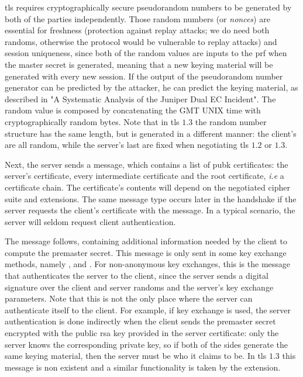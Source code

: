 \documentclass{llncs}
\begin{document}
\gls{tls} requires cryptographically secure pseudorandom numbers to be generated
by both of the parties independently. Those random numbers (or \textit{nonces}) are essential for freshness
(protection against replay attacks; we do need both randoms, otherwise the
protocol would be vulnerable to replay attacks) and session uniqueness, since both of
the random values are inputs to the \gls{prf} when the master secret is generated, meaning
that a new keying material will be generated with every new session. If the output of the pseudorandom number generator
can be predicted by the attacker, he can predict the keying material, as described
in "A Systematic Analysis of the Juniper Dual EC Incident"\cite{DualECJu15:online}.
The  random value is composed by concatenating the 
GMT UNIX time with  cryptographically random bytes. Note that in \gls{tls} $1.3$
the random number structure has the same length, but is generated in a different manner:
the client's  are all random, while the server's last 
are fixed when negotiating \gls{tls} $1.2$ or $1.3$.

Next, the server sends a  message, which contains a list
of \gls{pubk} certificates: the server's certificate,
every intermediate certificate and the root certificate, \textit{i.e} a certificate chain. The certificate's contents
will depend on the negotiated cipher suite and extensions.
The same message type occurs later in the handshake if the server requests the client's certificate with the
 message. In a typical scenario, the
server will seldom request client authentication.

The  message follows, containing additional information
needed by the client to compute the premaster secret. This message
is only sent in some key exchange methods, namely , 
and . For non-anonymous key exchanges, this is the message that authenticates the server to the client,
since the server sends a digital signature over the client and server randoms
and the server's key exchange parameters. Note that this is not the only place where the
server can authenticate itself to the client. For example, if  key
exchange is used, the server authentication is done indirectly when the client
sends the premaster secret encrypted with the public \gls{rsa} key provided in the
server certificate: only the server knows the corresponding private key, so if
both of the sides generate the same keying material, then the server must be who
it claims to be. In \gls{tls} $1.3$ this message is non existent and a similar
functionality is taken by the  extension.
\end{document}
